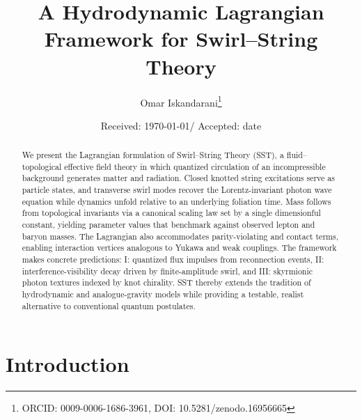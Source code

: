 \documentclass[smallextended]{svjour3}       %
\begin{document}
\title{A Hydrodynamic Lagrangian Framework for Swirl--String Theory}

\author{Omar Iskandarani\thanks{ORCID: 0009-0006-1686-3961, DOI: 10.5281/zenodo.16956665}}

\date{Received: \today / Accepted: date}

\maketitle

\begin{abstract}
We present the Lagrangian formulation of Swirl–String Theory (SST), a fluid–topological effective field theory in which quantized circulation of an incompressible background generates matter and radiation. Closed knotted string excitations serve as particle states, and transverse swirl modes recover the Lorentz-invariant photon wave equation while dynamics unfold relative to an underlying foliation time. Mass follows from topological invariants via a canonical scaling law set by a single dimensionful constant, yielding parameter values that benchmark against observed lepton and baryon masses. The Lagrangian also accommodates parity-violating and contact terms, enabling interaction vertices analogous to Yukawa and weak couplings. The framework makes concrete predictions: I: quantized flux impulses from reconnection events, II: interference-visibility decay driven by finite-amplitude swirl, and III: skyrmionic photon textures indexed by knot chirality. SST thereby extends the tradition of hydrodynamic and analogue-gravity models while providing a testable, realist alternative to conventional quantum postulates.

\end{abstract}


	\section{Introduction}
\end{document}
